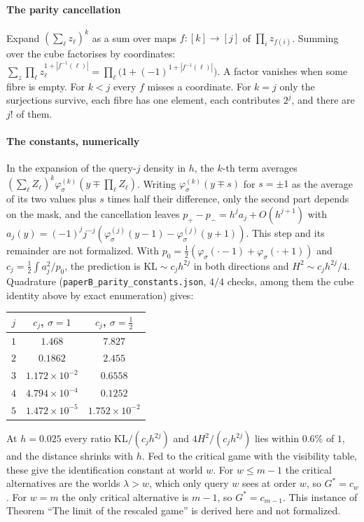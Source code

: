 \paragraph{The parity cancellation} Expand $(\sum_\ell z_\ell)^k$ as a sum over maps
$f:[k]\to[j]$ of $\prod_iz_{f(i)}$. Summing over the cube factorises by coordinates:
$\sum_z\prod_\ell z_\ell^{1+|f^{-1}(\ell)|}=\prod_\ell\bigl(1+(-1)^{1+|f^{-1}(\ell)|}\bigr)$. A
factor vanishes when some fibre is empty. For $k<j$ every $f$ misses a coordinate. For $k=j$ only
the surjections survive, each fibre has one element, each contributes $2^j$, and there are $j!$
of them.

\paragraph{The constants, numerically} \NUM{} In the expansion of the query-$j$ density in $h$,
the $k$-th term averages $(\sum_\ell Z_\ell)^k\varphi_\sigma^{(k)}(y\mp\prod_\ell Z_\ell)$. Writing
$\varphi_\sigma^{(k)}(y\mp s)$ for $s=\pm1$ as the average of its two values plus $s$ times half
their difference, only the second part depends on the mask, and the cancellation leaves
$p_+-p_-=h^ja_j+O(h^{j+1})$ with
$a_j(y)=(-1)^jj^{-j}(\varphi_\sigma^{(j)}(y-1)-\varphi_\sigma^{(j)}(y+1))$. This step and its
remainder are not formalized. With $p_0=\frac12(\varphi_\sigma(\cdot-1)+\varphi_\sigma(\cdot+1))$ and
$c_j=\frac12\int a_j^2/p_0$, the prediction is $\mathrm{KL}\sim c_jh^{2j}$ in both directions and
$H^2\sim c_jh^{2j}/4$. Quadrature (\texttt{paperB\_parity\_constants.json}, $4/4$ checks, among
them the cube identity above by exact enumeration) gives:
\begin{center}
\footnotesize
\begin{tabular}{@{}ccc@{}}
\toprule
$j$ & $c_j$, $\sigma=1$ & $c_j$, $\sigma=\frac12$\\
\midrule
$1$ & $1.468$ & $7.827$\\
$2$ & $0.1862$ & $2.455$\\
$3$ & $1.172\times10^{-2}$ & $0.6558$\\
$4$ & $4.794\times10^{-4}$ & $0.1252$\\
$5$ & $1.472\times10^{-5}$ & $1.752\times10^{-2}$\\
\bottomrule
\end{tabular}
\end{center}
At $h=0.025$ every ratio $\mathrm{KL}/(c_jh^{2j})$ and $4H^2/(c_jh^{2j})$ lies within $0.6\%$ of
$1$, and the distance shrinks with $h$. Fed to the critical game with the visibility table, these
give the identification constant at world $w$. For $w\le m-1$ the critical alternatives are the
worlds $\lambda>w$, which only query $w$ sees at order $w$, so $G^*=c_w$. For $w=m$ the only
critical alternative is $m-1$, so $G^*=c_{m-1}$. This instance of Theorem ``The limit of the
rescaled game'' is derived here and not formalized.

